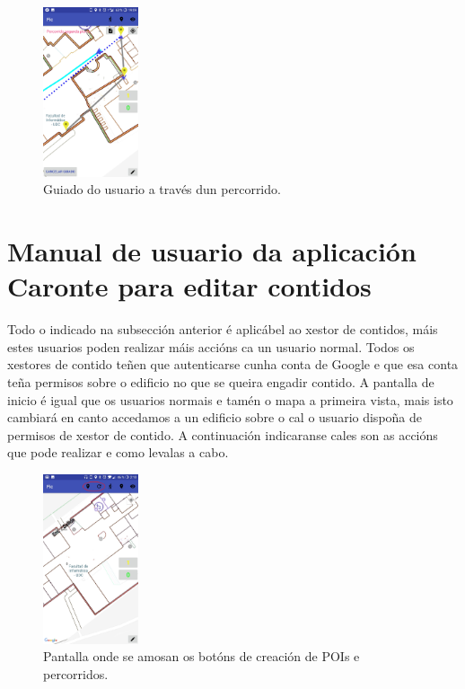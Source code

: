 \begin{figure}[H]
	\begin{center}
		\includegraphics[width=0.25\textwidth]{figures/android/guiadoPercorrido}
		\caption{Guiado do usuario a través dun percorrido.}
		\label{fig:guiadoPercorrido}
	\end{center}
\end{figure}

\section{Manual de usuario da aplicación Caronte para editar contidos}
Todo o indicado na subsección anterior é aplicábel ao xestor de contidos, máis estes usuarios poden realizar máis accións ca un usuario normal. Todos os xestores de contido teñen que autenticarse cunha conta de Google e que esa conta teña permisos sobre o edificio no que se queira engadir contido. A pantalla de inicio é igual que os usuarios normais e tamén o mapa a primeira vista, mais isto cambiará en canto accedamos a un edificio sobre o cal o usuario dispoña de permisos de xestor de contido. A continuación indicaranse cales son as accións que pode realizar e como levalas a cabo.

\begin{figure}[h]
	\begin{center}
		\includegraphics[width=0.25\textwidth]{figures/android/mapaXestorEdicion}
		\caption{Pantalla onde se amosan os botóns de creación de POIs e percorridos.}
		\label{fig:mapaXestorEdicion}
	\end{center}
\end{figure}


